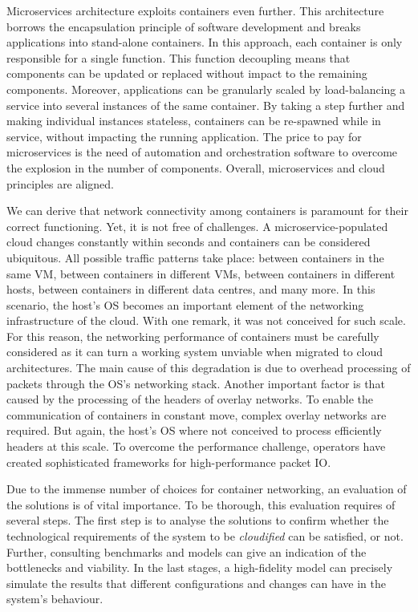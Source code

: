 \documentclass[conference]{IEEEtran}
\begin{document}
Microservices architecture exploits containers even further. This architecture borrows the encapsulation principle of software development and breaks applications into stand-alone containers. In this approach, each container is only responsible for a single function. This function decoupling means that components can be updated or replaced without impact to the remaining components. Moreover, applications can be granularly scaled by load-balancing a service into several instances of the same container. By taking a step further and making individual instances stateless, containers can be re-spawned while in service, without impacting the running application. The price to pay for microservices is the need of automation and orchestration software to overcome the explosion in the number of components. Overall, microservices and cloud principles are aligned.

We can derive that network connectivity among containers is paramount for their correct functioning.  Yet, it is not free of challenges. A microservice-populated cloud changes constantly within seconds and containers can be considered ubiquitous. All possible traffic patterns take place: between containers in the same VM, between containers in different VMs, between containers in different hosts, between containers in different data centres, and many more. In this scenario, the host's OS becomes an important element of the networking infrastructure of the cloud. With one remark, it was not conceived for such scale. For this reason, the networking performance of containers must be carefully considered as it can turn a working system unviable when migrated to cloud architectures. The main cause of this degradation is due to overhead processing of packets through the OS's networking stack. Another important factor is that caused by the processing of the headers of overlay networks. To enable the communication of containers in constant move, complex overlay networks are required. But again, the host's OS where not conceived to process efficiently headers at this scale. To overcome the performance challenge, operators have created sophisticated frameworks for high-performance packet IO.

Due to the immense number of choices for container networking, an evaluation of the solutions is of vital importance. To be thorough, this evaluation requires of several steps. The first step is to analyse the solutions to confirm whether the technological requirements of the system to be \textit{cloudified} can be satisfied, or not. Further, consulting benchmarks and models can give an indication of the bottlenecks and viability. In the last stages, a high-fidelity model can precisely simulate the results that different configurations and changes can have in the system's behaviour.
\end{document}
